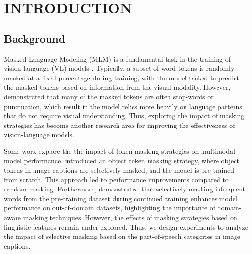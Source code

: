 \setlength{\parindent}{0in}
\setlength{\parskip}{1.5mm}
\setlength{\baselineskip}{1.6em}

\chapter{INTRODUCTION}
\section{Background}
Masked Language Modeling (MLM) is a fundamental task in the training of vision-language (VL) models \cite{albef, mplug, uniter, beit-3}. 
Typically, a subset of word tokens is randomly masked at a fixed percentage during training, with the model tasked to predict the masked tokens based on information from the visual modality. 
However,  demonstrated that many of the masked tokens are often stop-words or punctuation, which result in the model relies more heavily on language patterns that do not require visual understanding.
Thus, exploring the impact of masking strategies has become another research area for improving the effectiveness of vision-language models.

Some work explore the the impact of token masking strategies on multimodal model performance. 
 introduced an object token masking strategy, where object tokens in image captions are selectively masked, and the model is pre-trained from scratch.
This approach led to performance improvements compared to random masking. 
Furthermore,  demonstrated that selectively masking infrequent words from the pre-training dataset during continued training enhances model performance on out-of-domain datasets, highlighting the importance of domain-aware masking techniques.
However, the effects of masking strategies based on linguistic features remain under-explored. 
Thus, we design experiments to analyze the impact of selective masking based on the part-of-speech categories in image captions.


